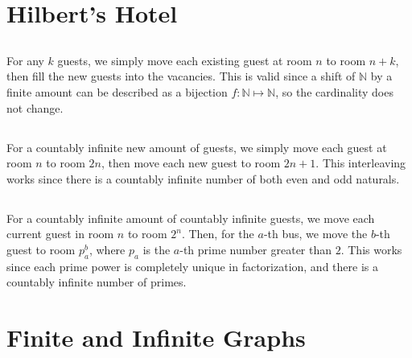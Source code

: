 \documentclass{article}
\newcommand{\N}{\mathbb{N}}
\begin{document}
\section{Hilbert's Hotel}

\subsection{}

For any \(k\) guests, we simply move each existing guest at room \(n\) to room \(n + k\), then fill the new guests into the vacancies.
This is valid since a shift of \(\N\) by a finite amount can be described as a bijection \(f: \N \mapsto \N\), so the cardinality does not change.

\subsection{}

For a countably infinite new amount of guests, we simply move each guest at room \(n\) to room \(2n\), then move each new guest to room \(2n + 1\).
This interleaving works since there is a countably infinite number of both even and odd naturals.

\subsection{}

For a countably infinite amount of countably infinite guests, we move each current guest in room \(n\) to room \(2^n\).
Then, for the \(a\)-th bus, we move the \(b\)-th guest to room \(p_a^b\), where \(p_a\) is the \(a\)-th prime number greater than \(2\).
This works since each prime power is completely unique in factorization, and there is a countably infinite number of primes.

\section{Finite and Infinite Graphs}

\subsection{}
\end{document}
